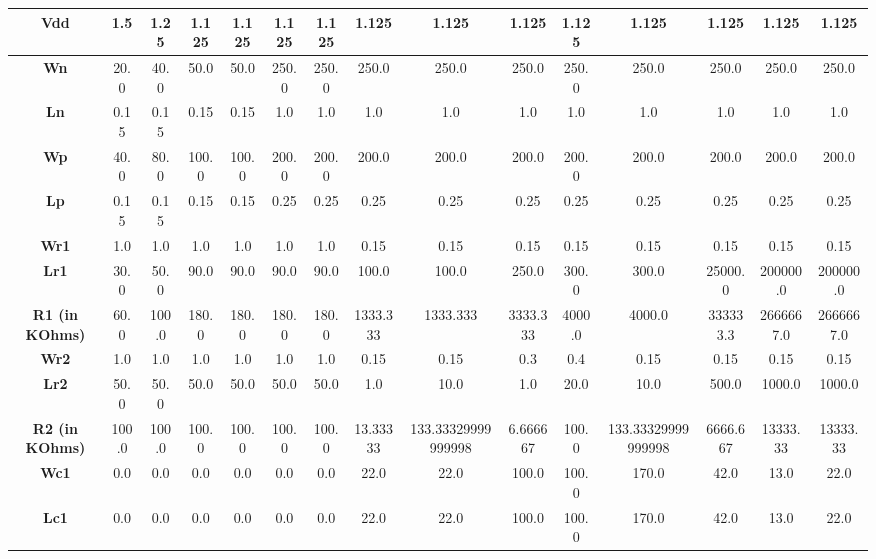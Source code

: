\begin{landscape}
\begin{table}[!ht]
    \centering
    \begin{adjustbox}{max width=\linewidth}
    \begin{tabular}{|c|c|c|c|c|c|c|c|c|c|c|c|c|c|c|}
        \hline
        \textbf{Vdd} & 1.5 & 1.25 & 1.125 & 1.125 & 1.125 & 1.125 & 1.125 & 1.125 & 1.125 & 1.125 & 1.125 & 1.125 & 1.125 & 1.125 \\ \hline
         \textbf{Wn} & 20.0 & 40.0 & 50.0 & 50.0 & 250.0 & 250.0 & 250.0 & 250.0 & 250.0 & 250.0 & 250.0 & 250.0 & 250.0 & 250.0 \\ \hline
            \textbf{Ln} & 0.15 & 0.15 & 0.15 & 0.15 & 1.0 & 1.0 & 1.0 & 1.0 & 1.0 & 1.0 & 1.0 & 1.0 & 1.0 & 1.0 \\ \hline
            \textbf{Wp} & 40.0 & 80.0 & 100.0 & 100.0 & 200.0 & 200.0 & 200.0 & 200.0 & 200.0 & 200.0 & 200.0 & 200.0 & 200.0 & 200.0 \\ \hline
            \textbf{Lp} & 0.15 & 0.15 & 0.15 & 0.15 & 0.25 & 0.25 & 0.25 & 0.25 & 0.25 & 0.25 & 0.25 & 0.25 & 0.25 & 0.25 \\ \hline
            \textbf{Wr1} & 1.0 & 1.0 & 1.0 & 1.0 & 1.0 & 1.0 & 0.15 & 0.15 & 0.15 & 0.15 & 0.15 & 0.15 & 0.15 & 0.15 \\ \hline
            \textbf{Lr1} & 30.0 & 50.0 & 90.0 & 90.0 & 90.0 & 90.0 & 100.0 & 100.0 & 250.0 & 300.0 & 300.0 & 25000.0 & 200000.0 & 200000.0 \\ \hline
            \textbf{R1 (in KOhms)} & 60.0 & 100.0 & 180.0 & 180.0 & 180.0 & 180.0 & 1333.333 & 1333.333 & 3333.333 & 4000.0 & 4000.0 & 333333.3 & 2666667.0 & 2666667.0 \\ \hline
            \textbf{Wr2} & 1.0 & 1.0 & 1.0 & 1.0 & 1.0 & 1.0 & 0.15 & 0.15 & 0.3 & 0.4 & 0.15 & 0.15 & 0.15 & 0.15 \\ \hline
            \textbf{Lr2} & 50.0 & 50.0 & 50.0 & 50.0 & 50.0 & 50.0 & 1.0 & 10.0 & 1.0 & 20.0 & 10.0 & 500.0 & 1000.0 & 1000.0 \\ \hline
            \textbf{R2 (in KOhms)} & 100.0 & 100.0 & 100.0 & 100.0 & 100.0 & 100.0 & 13.33333 & 133.33329999999998 & 6.666667 & 100.0 & 133.33329999999998 & 6666.667 & 13333.33 & 13333.33 \\ \hline
            \textbf{Wc1} & 0.0 & 0.0 & 0.0 & 0.0 & 0.0 & 0.0 & 22.0 & 22.0 & 100.0 & 100.0 & 170.0 & 42.0 & 13.0 & 22.0 \\ \hline
            \textbf{Lc1} & 0.0 & 0.0 & 0.0 & 0.0 & 0.0 & 0.0 & 22.0 & 22.0 & 100.0 & 100.0 & 170.0 & 42.0 & 13.0 & 22.0 \\ \hline

\end{tabular}
\end{adjustbox}
\end{table}
\end{landscape}
